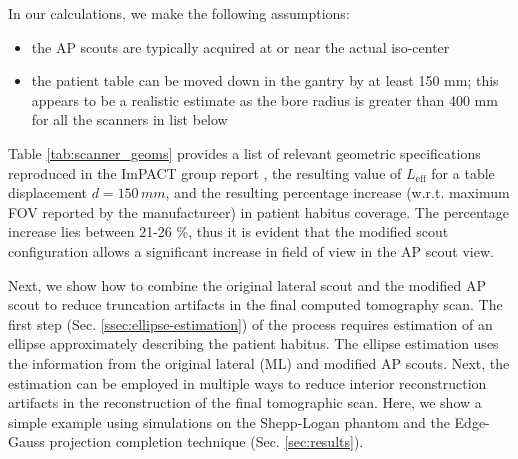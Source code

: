 \documentclass[]{spie}
\begin{document}
In our calculations, we make the following assumptions:
\begin{itemize}
	\item the AP scouts are typically acquired at or near the actual iso-center
	\item the patient table can be moved down in the gantry by at least 150 mm; this appears to be a realistic estimate as the bore radius is greater than 400 mm for all the scanners in list below
\end{itemize}

Table \ref{tab:scanner_geoms} provides a list of relevant geometric specifications reproduced in the ImPACT group report  \cite{ImPACTCenterforEvidencebasedPurchasing2009}, the resulting value of $L_{\mathrm{eff}}$ for a table displacement $d = 150 \, mm$, and the resulting percentage increase (w.r.t. maximum FOV reported by the manufactureer) in patient habitus coverage. The percentage increase lies between 21-26 \%, thus it is evident that the modified scout configuration allows a significant increase in field of view in the AP scout view. 

Next, we show how to combine the original lateral scout and the modified AP scout to reduce truncation artifacts in the final computed tomography scan. The first step (Sec. \ref{ssec:ellipse-estimation}) of the process requires estimation of an ellipse approximately describing the patient habitus. The ellipse estimation uses the information from the original lateral (ML) and modified AP scouts. Next, the estimation can be employed in multiple ways to reduce interior reconstruction artifacts in the reconstruction of the final tomographic scan. Here, we show a simple example using simulations on the Shepp-Logan phantom and the Edge-Gauss projection completion technique \cite{Hoppe2008} (Sec. \ref{sec:results}). 
\end{document}
